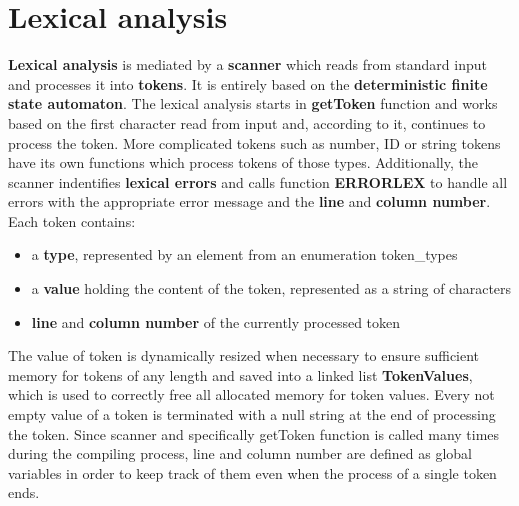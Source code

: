 \documentclass[a4paper, 11pt]{article}
\begin{document}
\section{Lexical analysis}\label{sec:LEX}
\textbf{Lexical analysis} is mediated by a \textbf{scanner} which reads from standard input and processes it into \textbf{tokens}.
It is entirely based on the \textbf{deterministic finite state automaton}. The lexical analysis starts in \textbf{getToken} function and works based on the 
first character read from input and, according to it, continues to process the token. 
More complicated tokens such as number, ID or string tokens have its own functions which process tokens of those types. Additionally, the scanner indentifies \textbf{lexical errors} and calls function \textbf{ERRORLEX} 
to handle all errors with the appropriate error message and the \textbf{line} and \textbf{column number}. 
Each token contains: 
\begin{itemize}
\item a \textbf{type}, represented by an element from an enumeration token\_types
\item a \textbf{value} holding the content of the token, represented as a string of characters
\item \textbf{line} and \textbf{column number} of the currently processed token
\end{itemize}
The value of token is dynamically resized when necessary to ensure sufficient memory for tokens of any length and saved 
into a linked list \textbf{TokenValues}, which is used to correctly free all allocated memory for token values. 
Every not empty value of a token is terminated with a null string at the end of processing the token. 
Since scanner and specifically getToken function is called many times during the compiling process, line and column 
number are defined as global variables in order to keep track of them even when the process of a single token ends. 
\end{document}
